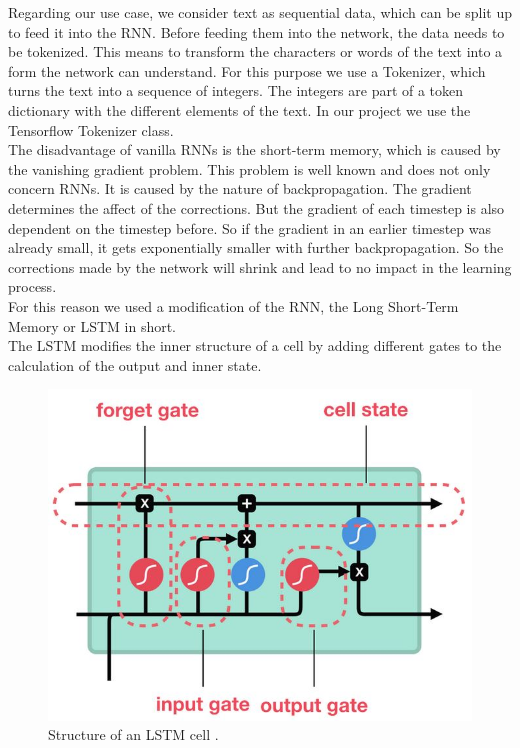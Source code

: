 \documentclass[hidelinks, conference]{IEEEtran}
\begin{document}
Regarding our use case, we consider text as sequential data, which can be split up to feed it into the RNN. Before feeding them into the network, the data needs to be tokenized. This means to transform the characters or words of the text into a form the network can understand. For this purpose we use a Tokenizer, which turns the text into a sequence of integers. The integers are part of a token dictionary with the different elements of the text. In our project we use the Tensorflow Tokenizer class.\\
The disadvantage of vanilla RNNs is the short-term memory, which is caused by the vanishing gradient problem. This problem is well known and does not only concern RNNs. It is caused by the nature of backpropagation. The gradient determines the affect of the corrections. But the gradient of each timestep is also dependent on the timestep before. So if the gradient in an earlier timestep was already small, it gets exponentially smaller with further backpropagation. So the corrections made by the network will shrink and lead to no impact in the learning process.\\
For this reason we used a modification of the RNN, the Long Short-Term Memory or LSTM in short.\\
The LSTM modifies the inner structure of a cell by adding different gates to the calculation of the output and inner state.

\begin{figure}[htbp]
\centerline{\includegraphics[scale=0.5]{pictures/structure_lstm.png}}
\caption{Structure of an LSTM cell \cite{tim3}.}
\label{fig:structure_lstm}
\end{figure}
\end{document}
